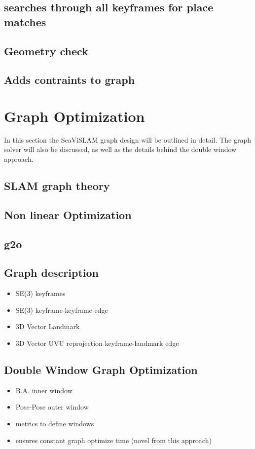 \subsection{searches through all keyframes for place matches}
\subsection{Geometry check}
\subsection{Adds contraints to graph}

\section{Graph Optimization}
\label{sec:scavislam_graph}

In this section the ScaViSLAM graph design will be outlined in detail.  The graph solver will also
be discussed, as well as the details behind the double window approach.

\subsection{SLAM graph theory}
\subsection{Non linear Optimization}
\subsection{g2o}
\subsection{Graph description}
\begin{itemize}
\itemsep0em
 \item SE(3) keyframes
 \item SE(3) keyframe-keyframe edge
 \item 3D Vector Landmark
 \item 3D Vector UVU reprojection keyframe-landmark edge
\end{itemize}

\subsection{Double Window Graph Optimization}
\begin{itemize}
\itemsep0em
 \item B.A. inner window
 \item Pose-Pose outer window
 \item metrics to define windows
 \item ensures constant graph optimize time (novel from this approach)
\end{itemize}
